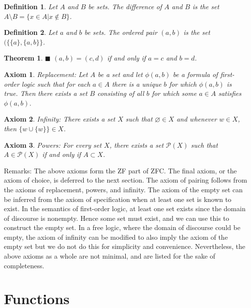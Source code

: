 \documentclass[a4paper]{article}
\newtheorem{mytheorem}{Theorem}
\newtheorem{axiom}{Axiom}
\newtheorem{mydef}{Definition}
\numberwithin{mytheorem}{section}
\numberwithin{mydef}{section}
\numberwithin{axiom}{section}
\numberwithin{example}{section}
\newcommand{\done}{$\blacksquare$ }
\begin{document}
\begin{mydef} Let $A$ and $B$ be sets. The difference of $A$ and $B$ is the set $A \setminus B = \{ x \in A | x \notin B \}$. 
\end{mydef}

\begin{mydef} Let $a$ and $b$ be sets. The ordered pair $(a,b)$ is the set $( \{ \{ a \}, \{ a, b \} \}$. 
\end{mydef}

\begin{mytheorem} \done $(a,b) = (c,d)$ if and only if $a = c$ and $b = d$. \end{mytheorem}

\begin{axiom} Replacement: Let $A$ be a set and let $\phi(a,b)$ be a formula of first-order logic such that for each $a \in A$ there is a unique $b$ for which $\phi(a,b)$ is true. Then there exists a set $B$ consisting of all $b$ for which some $a \in A$ satisfies $\phi(a,b)$.  
\end{axiom}

\begin{axiom} Infinity: There exists a set $X$ such that $\varnothing \in X$ and whenever $w \in X$, then $\{ w \cup \{ w \} \} \in X$.
\end{axiom}

\begin{axiom} Powers: For every set $X$, there exists a set $\mathcal{P}(X)$ such that $A \in \mathcal{P}(X)$ if and only if $A \subset X$.
\end{axiom}

Remarks: The above axioms form the ZF part of ZFC. The final axiom, or the axiom of choice, is deferred to the next section. The axiom of pairing follows from the axioms of replacement, powers, and infinity. The axiom of the empty set can be inferred from the axiom of specification when at least one set is known to exist. In the semantics of first-order logic, at least one set exists since the domain of discourse is nonempty. Hence some set must exist, and we can use this to construct the empty set. In a free logic, where the domain of discourse could be empty, the axiom of infinity can be modified to also imply the axiom of the empty set but we do not do this for simplicity and convenience. Nevertheless, the above axioms as a whole are not minimal, and are listed for the sake of completeness. 

\section{Functions}
\end{document}
